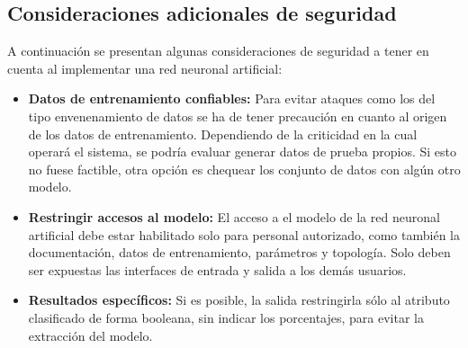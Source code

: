 \subsection{Consideraciones adicionales de seguridad}
A continuación se presentan algunas consideraciones de seguridad a tener en cuenta al implementar una red neuronal artificial:
\begin{itemize}
    \item \textbf{Datos de entrenamiento confiables:} Para evitar ataques como los del tipo envenenamiento de datos se ha de tener precaución en cuanto al origen de los datos de entrenamiento. Dependiendo de la criticidad en la cual operará el sistema, se podría evaluar generar datos de prueba propios. Si esto no fuese factible, otra opción es chequear los conjunto de datos con algún otro modelo.
    \item \textbf{Restringir accesos al modelo:} El acceso a el modelo de la red neuronal artificial debe estar habilitado solo para personal autorizado, como también la documentación, datos de entrenamiento, parámetros y topología. Solo deben ser expuestas las interfaces de entrada y salida a los demás usuarios.  
    \item \textbf{Resultados específicos:} Si es posible, la salida restringirla sólo al atributo clasificado de forma booleana, sin indicar los porcentajes, para evitar la extracción del modelo.

\end{itemize}
